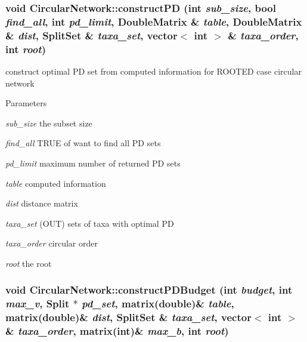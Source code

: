 \hypertarget{classCircularNetwork_a7bfd9c6ef8b4810c421b6613cdd3eecc}{
\subsubsection[{constructPD}]{\setlength{\rightskip}{0pt plus 5cm}void CircularNetwork::constructPD (int {\em sub\_\-size}, \/  bool {\em find\_\-all}, \/  int {\em pd\_\-limit}, \/  DoubleMatrix \& {\em table}, \/  DoubleMatrix \& {\em dist}, \/  {\bf SplitSet} \& {\em taxa\_\-set}, \/  vector$<$ int $>$ \& {\em taxa\_\-order}, \/  int {\em root})}}
\label{classCircularNetwork_a7bfd9c6ef8b4810c421b6613cdd3eecc}
construct optimal PD set from computed information for ROOTED case circular network 
\begin{DoxyParams}{Parameters}
\item[{\em sub\_\-size}]the subset size \item[{\em find\_\-all}]TRUE of want to find all PD sets \item[{\em pd\_\-limit}]maximum number of returned PD sets \item[{\em table}]computed information \item[{\em dist}]distance matrix \item[{\em taxa\_\-set}](OUT) sets of taxa with optimal PD \item[{\em taxa\_\-order}]circular order \item[{\em root}]the root \end{DoxyParams}
\hypertarget{classCircularNetwork_ac193309edd3ea5117af994273031f344}{
\subsubsection[{constructPDBudget}]{\setlength{\rightskip}{0pt plus 5cm}void CircularNetwork::constructPDBudget (int {\em budget}, \/  int {\em max\_\-v}, \/  {\bf Split} $\ast$ {\em pd\_\-set}, \/  matrix(double)\& {\em table}, \/  matrix(double)\& {\em dist}, \/  {\bf SplitSet} \& {\em taxa\_\-set}, \/  vector$<$ int $>$ \& {\em taxa\_\-order}, \/  matrix(int)\& {\em max\_\-b}, \/  int {\em root})}}
